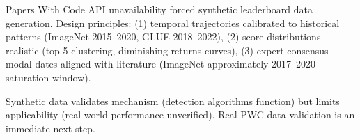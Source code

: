 
Papers With Code API unavailability forced synthetic leaderboard data generation. Design principles: (1) temporal trajectories calibrated to historical patterns (ImageNet 2015--2020, GLUE 2018--2022), (2) score distributions realistic (top-5 clustering, diminishing returns curves), (3) expert consensus modal dates aligned with literature (ImageNet approximately 2017--2020 saturation window).

Synthetic data validates mechanism (detection algorithms function) but limits applicability (real-world performance unverified). Real PWC data validation is an immediate next step.

